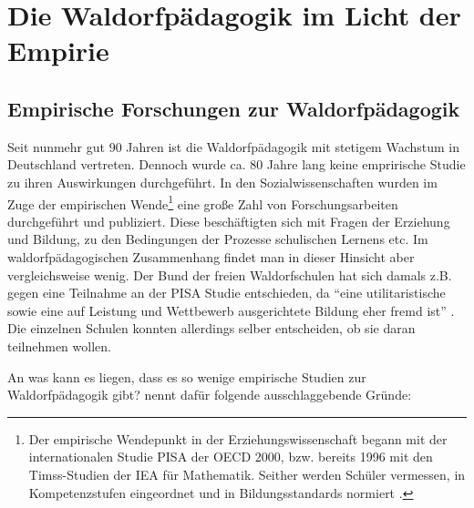 \section{Die Waldorfpädagogik im Licht der Empirie}
\subsection{Empirische Forschungen zur Waldorfpädagogik} %
\label{sub:empirische_forschung}


Seit nunmehr gut 90 Jahren ist die Waldorfpädagogik mit stetigem Wachstum in Deutschland vertreten. Dennoch wurde ca. 80 Jahre lang keine emprirische Studie zu ihren Auswirkungen durchgeführt. In den Sozialwissenschaften wurden im Zuge der empirischen Wende\footnote{Der empirische Wendepunkt in der Erziehungswissenschaft begann mit der internationalen Studie PISA der OECD 2000, bzw. bereits 1996 mit den Timss-Studien der IEA für Mathematik. Seither werden Schüler vermessen, in Kompetenzstufen eingeordnet und in Bildungsstandards normiert \citep[vgl.][]{arp11}.} eine große Zahl von Forschungsarbeiten durchgeführt und publiziert. Diese beschäftigten sich mit Fragen der Erziehung und Bildung, zu den Bedingungen der Prozesse schulischen Lernens etc. Im waldorfpädagogischen Zusammenhang findet man in dieser Hinsicht aber vergleichsweise wenig. Der Bund der freien Waldorfschulen hat sich damals z.B. gegen eine Teilnahme an der PISA Studie entschieden, da \enquote{eine utilitaristische sowie eine auf Leistung und Wettbewerb ausgerichtete Bildung eher fremd ist} \citep[vgl.][s.127ff]{paschen10}.  Die einzelnen Schulen konnten allerdings selber entscheiden, ob sie daran teilnehmen wollen.

An was kann es liegen, dass es so wenige empirische Studien zur Waldorfpädagogik gibt? \cite[S. 127f]{paschen10} nennt dafür folgende ausschlaggebende Gründe:

